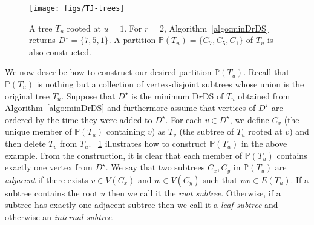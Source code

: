 \documentclass[a4paper]{article}
\theoremstyle{plain}
\theoremstyle{definition}
\begin{document}
\begin{figure}[ht]
	\centering
	\texttt{[image: figs/TJ-trees]}
	\caption{A tree $T_u$ rooted at $u = 1$. For $r = 2$, Algorithm~\ref{algo:minDrDS} returns $D^\star = \{7, 5, 1\}$. A partition $\mathbb{P}(T_u) = \{C_7, C_5, C_1\}$ of $T_u$ is also constructed.}
	\label{fig:TJ-trees}
\end{figure}

We now describe how to construct our desired partition $\mathbb{P}(T_u)$.
Recall that $\mathbb{P}(T_u)$ is nothing but a collection of vertex-disjoint subtrees whose union is the original tree $T_u$.
Suppose that $D^\star$ is the minimum D$r$DS of $T_u$ obtained from Algorithm~\ref{algo:minDrDS} and furthermore assume that vertices of $D^\star$ are ordered by the time they were added to $D^\star$.
For each $v \in D^\star$, we define $C_v$ (the unique member of $\mathbb{P}(T_u)$ containing $v$) as $T_v$ (the subtree of $T_u$ rooted at $v$) and then delete $T_v$ from $T_u$.
\figurename~\ref{fig:TJ-trees} illustrates how to construct $\mathbb{P}(T_u)$ in the above example.
From the construction, it is clear that each member of $\mathbb{P}(T_u)$ contains exactly one vertex from $D^\star$.
We say that two subtrees $C_x, C_y$ in $\mathbb{P}(T_u)$ are \textit{adjacent} if there exists $v \in V(C_x)$ and $w \in V(C_y)$ such that $vw \in E(T_u)$.
If a subtree contains the root $u$ then we call it the \textit{root subtree}.
Otherwise, if a subtree has exactly one adjacent subtree then we call it a \textit{leaf subtree} and otherwise an \textit{internal subtree}.
\end{document}
